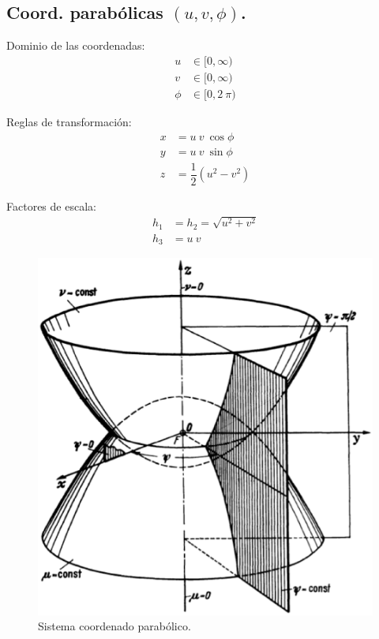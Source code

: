 \documentclass[12pt]{article}
\numberwithin{equation}{section}
\begin{document}
\subsection{Coord. parabólicas \texorpdfstring{$(u, v, \phi)$}{(u, v, f)}.}

\begin{minipage}{0.4\textwidth}
Dominio de las coordenadas:
\begin{align*}
u &\in [0, \infty) \\
v &\in [0, \infty) \\
\phi &\in [0, 2 \: \pi)
\end{align*}
\end{minipage}
\hspace{1cm}
\begin{minipage}{0.4\textwidth}
Reglas de transformación:
\begin{align*}
x &= u \: v \: \cos \phi \\
y &= u \: v \: \sin \phi \\
z &= \dfrac{1}{2} (u^{2} - v^{2})
\end{align*}
\end{minipage}

Factores de escala:
\begin{align*}
h_{1} &= h_{2} = \sqrt{u^{2 } +v^{2}} \\
h_{3} &= u \: v
\end{align*}

\begin{figure}[H]
    \centering
    \includegraphics[scale=0.5]{Imagenes/Sistema_Parabolico.eps}
    \caption{Sistema coordenado parabólico.}
\end{figure}
\end{document}
